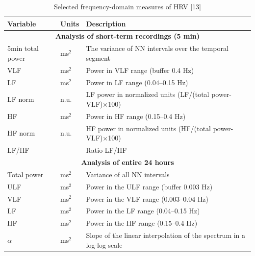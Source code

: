 \documentclass{article}
\begin{document}
\begin{table}[h]
\centering
\caption{Selected frequency-domain measures of HRV [13]}
\label{tab:HRV_freq}
\begin{tabular}{|l|l|l|}
\hline
\textbf{Variable} & \textbf{Units} & \textbf{Description} \\ \hline
\multicolumn{3}{|c|}{\textbf{Analysis of short-term recordings (5 min)}} \\ \hline
5min total power & ms$^2$ & The variance of NN intervals over the temporal segment \\ \hline
VLF & ms$^2$ & Power in VLF range (buffer 0.4 Hz) \\ \hline
LF & ms$^2$ & Power in LF range (0.04–0.15 Hz) \\ \hline
LF norm & n.u. & LF power in normalized units (LF/(total power-VLF)×100) \\ \hline
HF & ms$^2$ & Power in HF range (0.15–0.4 Hz) \\ \hline
HF norm & n.u. & HF power in normalized units (HF/(total power-VLF)×100) \\ \hline
LF/HF & - & Ratio LF/HF \\ \hline
\multicolumn{3}{|c|}{\textbf{Analysis of entire 24 hours}} \\ \hline
Total power & ms$^2$ & Variance of all NN intervals \\ \hline
ULF & ms$^2$ & Power in the ULF range (buffer 0.003 Hz) \\ \hline
VLF & ms$^2$ & Power in the VLF range (0.003–0.04 Hz) \\ \hline
LF & ms$^2$ & Power in the LF range (0.04–0.15 Hz) \\ \hline
HF & ms$^2$ & Power in the HF range (0.15–0.4 Hz) \\ \hline
$\alpha$ & ms$^2$ & Slope of the linear interpolation of the spectrum in a log-log scale \\ \hline
\end{tabular}
\end{table}
\end{document}
